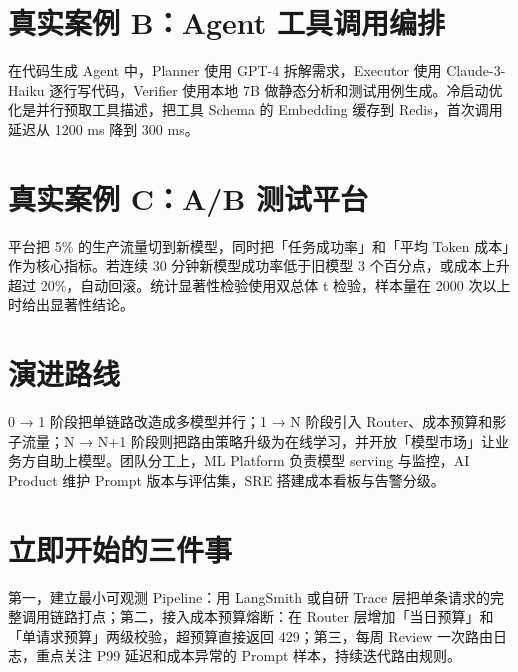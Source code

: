 \chapter{真实案例 B：Agent 工具调用编排}
在代码生成 Agent 中，Planner 使用 GPT-4 拆解需求，Executor 使用 Claude-3-Haiku 逐行写代码，Verifier 使用本地 7B 做静态分析和测试用例生成。冷启动优化是并行预取工具描述，把工具 Schema 的 Embedding 缓存到 Redis，首次调用延迟从 1200 ms 降到 300 ms。\par
\chapter{真实案例 C：A/B 测试平台}
平台把 5\%{} 的生产流量切到新模型，同时把「任务成功率」和「平均 Token 成本」作为核心指标。若连续 30 分钟新模型成功率低于旧模型 3 个百分点，或成本上升超过 20\%{}，自动回滚。统计显著性检验使用双总体 t 检验，样本量在 2000 次以上时给出显著性结论。\par
\chapter{演进路线}
0 → 1 阶段把单链路改造成多模型并行；1 → N 阶段引入 Router、成本预算和影子流量；N → N+1 阶段则把路由策略升级为在线学习，并开放「模型市场」让业务方自助上模型。团队分工上，ML Platform 负责模型 serving 与监控，AI Product 维护 Prompt 版本与评估集，SRE 搭建成本看板与告警分级。\par
\chapter{立即开始的三件事}
第一，建立最小可观测 Pipeline：用 LangSmith 或自研 Trace 层把单条请求的完整调用链路打点；第二，接入成本预算熔断：在 Router 层增加「当日预算」和「单请求预算」两级校验，超预算直接返回 429；第三，每周 Review 一次路由日志，重点关注 P99 延迟和成本异常的 Prompt 样本，持续迭代路由规则。\par
